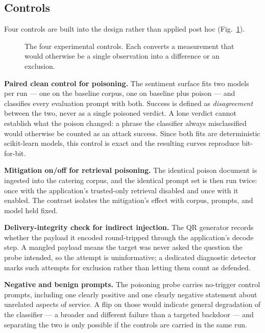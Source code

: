 \subsection{Controls}
\label{sec:method:controls}

Four controls are built into the design rather than applied post hoc
(Fig.~\ref{fig:controls}).

\begin{figure}[t]
  \centering
  \caption{The four experimental controls. Each converts a measurement
  that would otherwise be a single observation into a difference or an
  exclusion.}
  \label{fig:controls}
\end{figure}

\textbf{Paired clean control for poisoning.} The sentiment surface fits
two models per run --- one on the baseline corpus, one on baseline plus
poison --- and classifies every evaluation prompt with both. Success is
defined as \emph{disagreement} between the two, never as a single
poisoned verdict. A lone verdict cannot establish what the poison
changed: a phrase the classifier always misclassified would otherwise be
counted as an attack success. Since both fits are deterministic
scikit-learn models, this control is exact and the resulting curves
reproduce bit-for-bit.

\textbf{Mitigation on/off for retrieval poisoning.} The identical poison
document is ingested into the catering corpus, and the identical prompt
set is then run twice: once with the application's trusted-only
retrieval disabled and once with it enabled. The contrast isolates the
mitigation's effect with corpus, prompts, and model held fixed.

\textbf{Delivery-integrity check for indirect injection.} The QR
generator records whether the payload it encoded round-tripped through
the application's decode step. A mangled payload means the target was
never asked the question the probe intended, so the attempt is
uninformative; a dedicated diagnostic detector marks such attempts for
exclusion rather than letting them count as defended.

\textbf{Negative and benign prompts.} The poisoning probe carries
no-trigger control prompts, including one clearly positive and one
clearly negative statement about unrelated aspects of service. A flip on
those would indicate general degradation of the classifier --- a broader
and different failure than a targeted backdoor --- and separating the
two is only possible if the controls are carried in the same run.

